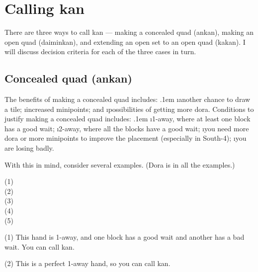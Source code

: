 \newpage

\section{Calling {\jap kan}} \label{sec:kan}  

There are three ways to call {\jap kan} --- making a concealed quad ({\jap ankan}), making an open quad ({\jap daiminkan}), and extending an open set to an open quad ({\jap kakan}). I will discuss decision criteria for each of the three cases in turn.

\subsection{Concealed quad ({\jap ankan})}
The benefits of making a concealed quad includes:
\bi \itemsep.1em
\i another chance to draw a tile;
\i increased minipoints; and
\i possibilities of getting more {\jap dora}.
\ei
Conditions to justify making a concealed quad includes:
\bi \itemsep.1em
\i 1-away, where at least one block has a good wait;
\i 2-away, where all the blocks have a good wait;
\i you need more {\jap dora} or more minipoints to improve the placement (especially in South-4);
\i you are losing badly.
\ei

With this in mind, consider several examples. ({\jap Dora} is {\LARGE\xi} in all the examples.)

\bp
{\small (1)}
\bei\bei\bei\bei\\
{\small (2)}
\bei\bei\bei\bei\\
{\small (3)}
\bei\bei\bei\bei\\
{\small (4)}
\bei\bei\bei\bei\bai\\
{\small (5)}
\bei\bei\bei\bei\bai\bai\\
\ep

\noindent (1) This hand is 1-away, and one block has a good wait and another has a bad wait. You can call {\jap kan}. 

\noindent (2) This is a perfect 1-away hand, so you can call {\jap kan}.

